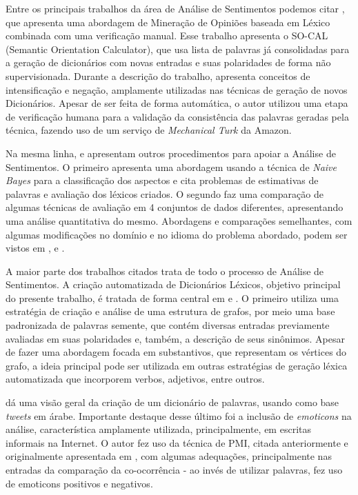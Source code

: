 \documentclass[a4paper,11pt]{article}
\begin{document}
Entre os principais trabalhos da área de Análise de Sentimentos podemos citar \cite{taboada2011lexicon}, que apresenta uma abordagem de Mineração de Opiniões baseada em Léxico combinada com uma verificação manual. Esse trabalho apresenta o SO-CAL (Semantic Orientation Calculator), que usa lista de palavras já consolidadas para a geração de dicionários com novas entradas e suas polaridades de forma não supervisionada. Durante a descrição do trabalho, apresenta conceitos de intensificação e negação, amplamente utilizadas nas técnicas de geração de novos Dicionários. Apesar de ser feita de forma automática, o autor utilizou uma etapa de verificação humana para a validação da consistência das palavras geradas pela técnica, fazendo uso de um serviço de\emph{ Mechanical Turk} da Amazon. 

Na mesma linha, \cite{eisenstein2016unsupervised} e \cite{bandhakavi2016lexicon} apresentam outros procedimentos para apoiar a Análise de Sentimentos. O primeiro apresenta uma abordagem usando a técnica de \emph{Naive Bayes} para a classificação dos aspectos e cita problemas de estimativas de palavras e avaliação dos léxicos criados. O segundo faz uma comparação de algumas técnicas de avaliação em 4 conjuntos de dados diferentes, apresentando uma análise quantitativa do mesmo. Abordagens e comparações semelhantes, com algumas modificações no domínio e no idioma do problema abordado, podem ser vistos em \cite{khoo2017lexicon}, \cite{asghar2014review} e \cite{ding2008holistic}.

A maior parte dos trabalhos citados trata de todo o processo de Análise de Sentimentos. A criação automatizada de Dicionários Léxicos, objetivo principal do presente trabalho, é tratada de forma central em \cite{widdows2002graph} e \cite{duwairi2015detecting}. O primeiro utiliza uma estratégia de criação e análise de uma estrutura de grafos, por meio uma base padronizada de palavras semente, que contém diversas entradas previamente avaliadas em suas polaridades e, também, a descrição de seus sinônimos. Apesar de fazer uma abordagem focada em substantivos, que representam os vértices do grafo, a ideia principal pode ser utilizada em outras estratégias de geração léxica automatizada que incorporem verbos, adjetivos, entre outros. 

\cite{duwairi2015detecting} dá uma visão geral da criação de um dicionário de palavras, usando como base \emph{tweets} em árabe. Importante destaque desse último foi a inclusão de \emph{emoticons} na análise, característica amplamente utilizada, principalmente, em escritas informais na Internet. O autor fez uso da técnica de PMI, citada anteriormente e originalmente apresentada em  \cite{Turney2002}, com algumas adequações, principalmente nas entradas da comparação da co-ocorrência - ao invés de utilizar palavras, fez uso de emoticons positivos e negativos.
\end{document}
